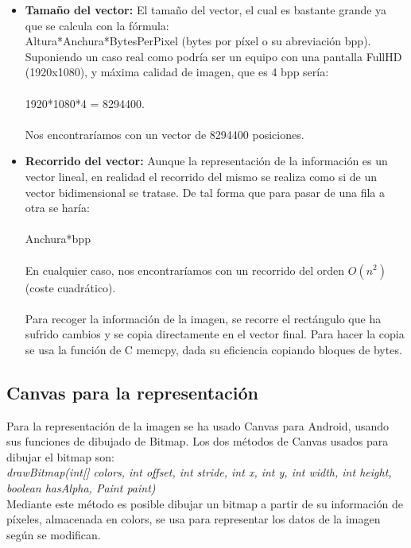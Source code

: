 \begin{itemize}
\item \textbf{Tamaño del vector:} El tamaño del vector, el cual es bastante grande ya que se calcula con la fórmula:\\
Altura*Anchura*BytesPerPixel (bytes por píxel o su abreviación bpp).\\
Suponiendo un caso real como podría ser un equipo con una pantalla FullHD (1920x1080), y máxima calidad de imagen, que es 4 bpp sería:\\
\\
1920*1080*4 = 8294400.\\
\\
Nos encontraríamos con un vector de 8294400 posiciones.\\
\item \textbf{Recorrido del vector:} Aunque la representación de la información es un vector lineal, en realidad el recorrido del mismo se realiza como si de un vector bidimensional se tratase. De tal forma que para pasar de una fila a otra se haría:\\
\\
Anchura*bpp\\
\\
En cualquier caso, nos encontraríamos con un recorrido del orden $O(n^2)$ (coste cuadrático).\\
\\
Para recoger la información de la imagen, se recorre el rectángulo que ha sufrido cambios y se copia directamente en el vector final. Para hacer la copia se usa la función de C memcpy, dada su eficiencia copiando bloques de bytes.\\
\end{itemize}

\subsection{Canvas para la representación}

Para la representación de la imagen se ha usado Canvas para Android, usando sus funciones de dibujado de Bitmap. Los dos métodos de Canvas usados para dibujar el bitmap son:\\

\emph{drawBitmap(int[] colors, int offset, int stride, int x, int y, int width, int height, boolean hasAlpha, Paint paint)}\\

Mediante este método es posible dibujar un bitmap a partir de su información de píxeles, almacenada en colors, se usa para representar los datos de la imagen según se modifican.\\

